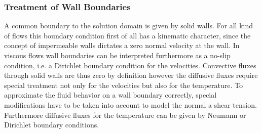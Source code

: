 \subsubsection{Treatment of Wall Boundaries}
\label{seg:walls}
    
A common boundary to the solution domain is given by solid walls. For all kind of flows this boundary condition first of all has a kinematic character, since the concept of impermeable walls dictates a zero normal velocity at the wall. In viscous flows wall boundaries can be interpreted furthermore as a no-slip condition, i.e. a Dirichlet boundary condition for the velocities. Convective fluxes through solid walls are thus zero by definition however the diffusive fluxes require special treatment not only for the velocities but also for the temperature. To approximate the fluid behavior on a wall boundary correctly, special modifications have to be taken into account to model the normal a shear tension. Furthermore diffusive fluxes for the temperature can be given by Neumann or Dirichlet boundary conditions.

